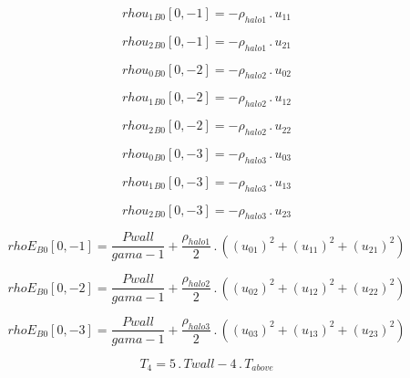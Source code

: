 \documentclass{article}
\begin{document}
\begin{dmath}{rhou_{1}{_{B0}}}[{0,-1}] = - \rho_{halo 1} \,.\, u_{11}\end{dmath}

\begin{dmath}{rhou_{2}{_{B0}}}[{0,-1}] = - \rho_{halo 1} \,.\, u_{21}\end{dmath}

\begin{dmath}{rhou_{0}{_{B0}}}[{0,-2}] = - \rho_{halo 2} \,.\, u_{02}\end{dmath}

\begin{dmath}{rhou_{1}{_{B0}}}[{0,-2}] = - \rho_{halo 2} \,.\, u_{12}\end{dmath}

\begin{dmath}{rhou_{2}{_{B0}}}[{0,-2}] = - \rho_{halo 2} \,.\, u_{22}\end{dmath}

\begin{dmath}{rhou_{0}{_{B0}}}[{0,-3}] = - \rho_{halo 3} \,.\, u_{03}\end{dmath}

\begin{dmath}{rhou_{1}{_{B0}}}[{0,-3}] = - \rho_{halo 3} \,.\, u_{13}\end{dmath}

\begin{dmath}{rhou_{2}{_{B0}}}[{0,-3}] = - \rho_{halo 3} \,.\, u_{23}\end{dmath}

\begin{dmath}{rhoE{_{B0}}}[{0,-1}] = \frac{Pwall}{gama - 1} + \frac{\rho_{halo 1}}{2} \,.\, \left(\left(u_{01} \right)^{2} + \left(u_{11} \right)^{2} + \left(u_{21} \right)^{2}\right)\end{dmath}

\begin{dmath}{rhoE{_{B0}}}[{0,-2}] = \frac{Pwall}{gama - 1} + \frac{\rho_{halo 2}}{2} \,.\, \left(\left(u_{02} \right)^{2} + \left(u_{12} \right)^{2} + \left(u_{22} \right)^{2}\right)\end{dmath}

\begin{dmath}{rhoE{_{B0}}}[{0,-3}] = \frac{Pwall}{gama - 1} + \frac{\rho_{halo 3}}{2} \,.\, \left(\left(u_{03} \right)^{2} + \left(u_{13} \right)^{2} + \left(u_{23} \right)^{2}\right)\end{dmath}

\begin{dmath}T_{4} = 5 \,.\, Twall - 4 \,.\, T_{above}\end{dmath}
\end{document}
